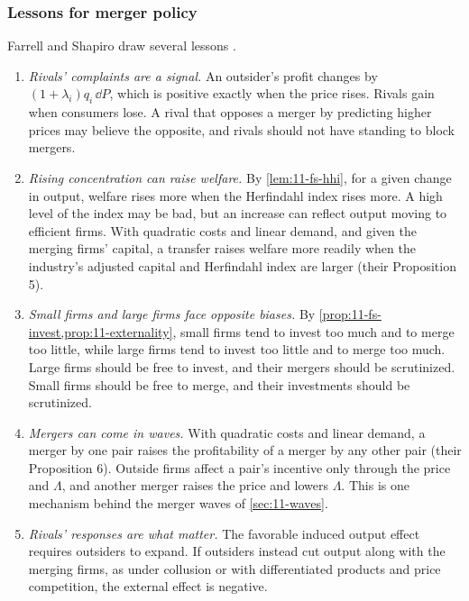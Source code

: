 \subsubsection{Lessons for merger policy}

Farrell and Shapiro draw several lessons \citep[pp.~15, 20--21 and 25--26]{FarrellShapiro1988}.
\begin{enumerate}[label=(\roman*)]
  \item \emph{Rivals' complaints are a signal.} An outsider's profit changes by $(1 + \lambda_i)q_i\,\dd P$, which
  is positive exactly when the price rises. Rivals gain when consumers lose. A rival that opposes a merger by
  predicting higher prices may believe the opposite, and rivals should not have standing to block mergers.
  \item \emph{Rising concentration can raise welfare.} By \cref{lem:11-fs-hhi}, for a given change in output,
  welfare rises more when the Herfindahl index rises more. A high level of the index may be bad, but an increase
  can reflect output moving to efficient firms. With quadratic costs and linear demand, and given the merging
  firms' capital, a transfer raises welfare more readily when the industry's adjusted capital and Herfindahl index
  are larger (their Proposition 5).
  \item \emph{Small firms and large firms face opposite biases.} By \cref{prop:11-fs-invest,prop:11-externality},
  small firms tend to invest too much and to merge too little, while large firms tend to invest too little and
  to merge too much. Large firms should be free to invest, and their mergers should be scrutinized. Small firms
  should be free to merge, and their investments should be scrutinized.
  \item \emph{Mergers can come in waves.} With quadratic costs and linear demand, a merger by one pair raises the
  profitability of a merger by any other pair (their Proposition 6). Outside firms affect a pair's incentive only
  through the price and $\Lambda$, and another merger raises the price and lowers $\Lambda$. This is one
  mechanism behind the merger waves of \cref{sec:11-waves}.
  \item \emph{Rivals' responses are what matter.} The favorable induced output effect requires outsiders to
  expand. If outsiders instead cut output along with the merging firms, as under collusion or with differentiated
  products and price competition, the external effect is negative.
\end{enumerate}

